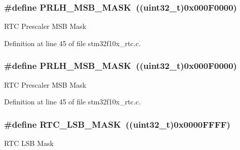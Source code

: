 \subsubsection[{\texorpdfstring{P\+R\+L\+H\+\_\+\+M\+S\+B\+\_\+\+M\+A\+SK}{PRLH_MSB_MASK}}]{\setlength{\rightskip}{0pt plus 5cm}\#define P\+R\+L\+H\+\_\+\+M\+S\+B\+\_\+\+M\+A\+SK~(({\bf uint32\+\_\+t})0x000\+F0000)}\hypertarget{group___r_t_c___private___defines_ga47b3eed8e018a9139bc7bb374c7ca125}{}\label{group___r_t_c___private___defines_ga47b3eed8e018a9139bc7bb374c7ca125}
R\+TC Prescaler M\+SB Mask 

Definition at line 45 of file stm32f10x\+\_\+rtc.\+c.

\subsubsection[{\texorpdfstring{P\+R\+L\+H\+\_\+\+M\+S\+B\+\_\+\+M\+A\+SK}{PRLH_MSB_MASK}}]{\setlength{\rightskip}{0pt plus 5cm}\#define P\+R\+L\+H\+\_\+\+M\+S\+B\+\_\+\+M\+A\+SK~(({\bf uint32\+\_\+t})0x000\+F0000)}\hypertarget{group___r_t_c___private___defines_ga47b3eed8e018a9139bc7bb374c7ca125}{}\label{group___r_t_c___private___defines_ga47b3eed8e018a9139bc7bb374c7ca125}
R\+TC Prescaler M\+SB Mask 

Definition at line 45 of file stm32f10x\+\_\+rtc.\+c.

\subsubsection[{\texorpdfstring{R\+T\+C\+\_\+\+L\+S\+B\+\_\+\+M\+A\+SK}{RTC_LSB_MASK}}]{\setlength{\rightskip}{0pt plus 5cm}\#define R\+T\+C\+\_\+\+L\+S\+B\+\_\+\+M\+A\+SK~(({\bf uint32\+\_\+t})0x0000\+F\+F\+F\+F)}\hypertarget{group___r_t_c___private___defines_gae19d75bb0ecb5e93d97e026a04d4854f}{}\label{group___r_t_c___private___defines_gae19d75bb0ecb5e93d97e026a04d4854f}
R\+TC L\+SB Mask 

